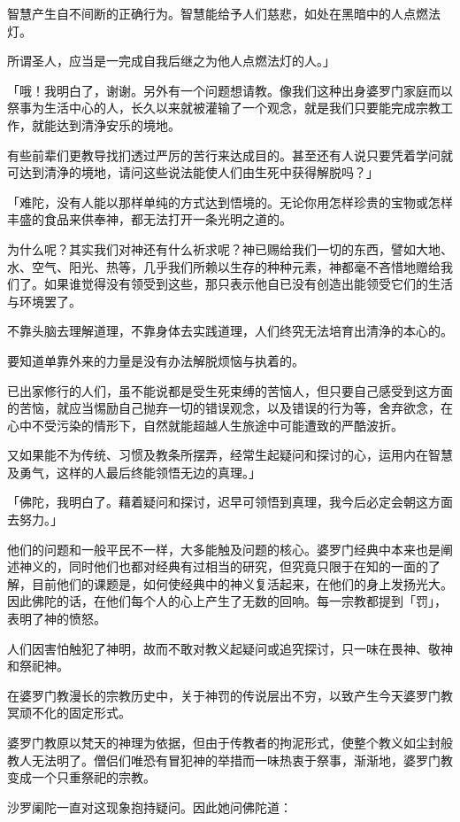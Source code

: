 \documentclass[twoside,openany]{book}
\begin{document}
智慧产生自不间断的正确行为。智慧能给予人们慈悲，如处在黑暗中的人点燃法灯。

所谓圣人，应当是一完成自我后继之为他人点燃法灯的人。」

「哦！我明白了，谢谢。另外有一个问题想请教。像我们这种出身婆罗门家庭而以祭事为生活中心的人，长久以来就被灌输了一个观念，就是我们只要能完成宗教工作，就能达到清浄安乐的境地。

有些前辈们更教导找扪透过严厉的苦行来达成目的。甚至还有人说只要凭着学问就可达到清浄的境地，请问这些说法能使人们由生死中获得解脱吗？」

「难陀，没有人能以那样单纯的方式达到悟境的。无论你用怎样珍贵的宝物或怎样丰盛的食品来供奉神，都无法打开一条光明之道的。

为什么呢？其实我们对神还有什么祈求呢？神已赐给我们一切的东西，譬如大地、水、空气、阳光、热等，几乎我们所赖以生存的种种元素，神都毫不吝惜地赠给我们了。如果谁觉得没有领受到这些，那只表示他自已没有创造出能领受它们的生活与环境罢了。

不靠头脑去理解道理，不靠身体去实践道理，人们终究无法培育出清浄的本心的。

要知道单靠外来的力量是没有办法解脱烦恼与执着的。

已出家修行的人们，虽不能说都是受生死束缚的苦恼人，但只要自己感受到这方面的苦恼，就应当惕励自己抛弃一切的错误观念，以及错误的行为等，舍弃欲念，在心中不受污染的情形下，自然就能超越人生旅途中可能遭致的严酷波折。

又如果能不为传统、习惯及教条所摆弄，经常生起疑问和探讨的心，运用内在智慧及勇气，这样的人最后终能领悟无边的真理。」

「佛陀，我明白了。藉着疑问和探讨，迟早可领悟到真理，我今后必定会朝这方面去努力。」

他们的问题和一般平民不一样，大多能触及问题的核心。婆罗门经典中本来也是阐述神义的，同时他们也都对经典有过相当的研究，但究竟只限于在知的一面的了解，目前他们的课题是，如何使经典中的神义复活起来，在他们的身上发扬光大。因此佛陀的话，在他们每个人的心上产生了无数的回响。每一宗教都提到「罚」，表明了神的愤怒。

人们因害怕触犯了神明，故而不敢对教义起疑问或追究探讨，只一味在畏神、敬神和祭祀神。

在婆罗门教漫长的宗教历史中，关于神罚的传说层出不穷，以致产生今天婆罗门教冥顽不化的固定形式。

婆罗门教原以梵天的神理为依据，但由于传教者的拘泥形式，使整个教义如尘封般教人无法明了。僧侣们唯恐有冒犯神的举措而一味热衷于祭事，渐渐地，婆罗门教变成一个只重祭祀的宗教。

沙罗阑陀一直对这现象抱持疑问。因此她问佛陀道：
\end{document}
